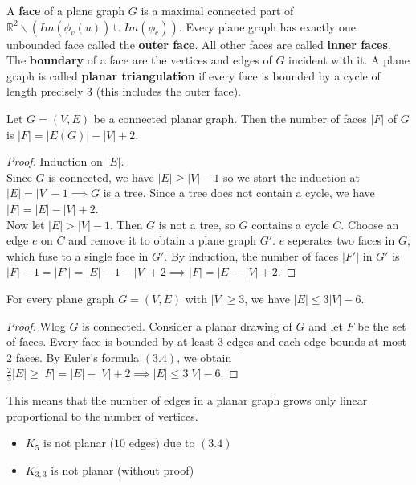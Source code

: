 \vspace{0.5cm}
\begin{definition}
    A \textbf{face} of a plane graph $G$ is a maximal connected part of $\mathbb{R}^2\backslash(Im(\phi_v(u))\cup Im(\phi_e))$. Every plane graph has exactly one unbounded face called the \textbf{outer face}. All other faces are called \textbf{inner faces}. The \textbf{boundary} of a face are the vertices and edges of $G$ incident with it. A plane graph is called \textbf{planar triangulation} if every face is bounded by a cycle of length precisely 3 (this includes the outer face).
\end{definition}
\vspace{0.5cm}
\begin{theorem}
    Let $G=(V,E)$ be a connected planar graph. Then the number of faces $|F|$ of $G$ is $|F|=|E(G)|-|V|+2$.
\end{theorem}
\begin{proof}
    Induction on $|E|$. \\
    Since $G$ is connected, we have $|E|\geq|V|-1$ so we start the induction at $|E|=|V|-1\implies G$ is a tree. Since a tree does not contain a cycle, we have $|F|=|E|-|V|+2$. \\
    Now let $|E|>|V|-1$. Then $G$ is not a tree, so $G$ contains a cycle $C$. Choose an edge $e$ on $C$ and remove it to obtain a plane graph $G'$. $e$ seperates two faces in $G$, which fuse to a single face in $G'$. By induction, the number of faces $|F'|$ in $G'$ is $|F|-1=|F'|=|E|-1-|V|+2\implies|F|=|E|-|V|+2$.
\end{proof}
\vspace{2cm}
\begin{lemma}
    For every plane graph $G=(V,E)$ with $|V|\geq3$, we have $|E|\leq3|V|-6$.
\end{lemma}
\begin{proof}
    Wlog $G$ is connected. Consider a planar drawing of $G$ and let $F$ be the set of faces. Every face is bounded by at least $3$ edges and each edge bounds at most $2$ faces. By Euler's formula $(3.4)$, we obtain $\frac{2}{3}|E|\geq|F|=|E|-|V|+2\implies|E|\leq3|V|-6$. 
\end{proof}
\begin{remark}
    This means that the number of edges in a planar graph grows only linear proportional to the number of vertices. 
\end{remark}
\vspace{0.5cm}
\begin{example}
    \hfill\begin{itemize}
        \item $K_5$ is not planar ($10$ edges) due to $(3.4)$
        \item $K_{3,3}$ is not planar (without proof)
    \end{itemize}
\end{example}
